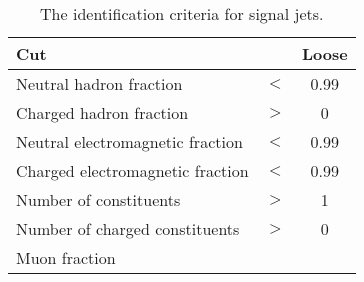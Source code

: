 \begin{table}[h!]
    \centering
    \caption{The identification criteria for signal jets.}
    \label{tb:jetID}
    \begin{tabular}{lcc}
            \textbf{Cut}      			&		    & \textbf{Loose}  \\
            \hline
            Neutral hadron fraction 			& $<$ &	0.99 \\			
            Charged hadron fraction           	& $>$ &	0 \\		   
            Neutral electromagnetic fraction 	& $<$ &	0.99 \\		
            Charged electromagnetic fraction    & $<$ & 0.99 \\
            Number of constituents 				& $>$ &	1 \\		
			Number of charged constituents      & $>$ &	0 \\		
            Muon fraction 						&  	  & \NA{} \\		
    \end{tabular} \\
\end{table}


